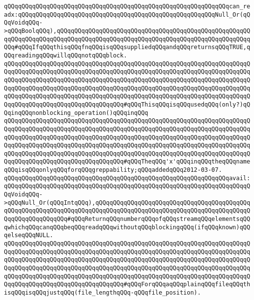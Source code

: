 \newline
\verb|qQQqqQQqqQQqqQQqqQQqqQQqqQQqqQQqqQQqqQQqqQQqqQQqqQQqqQQqqQQqqQQqcan_readx:qQQqqQQqqQQqqQQqqQQqqQQqqQQqqQQqqQQqqQQqqQQqqQQqqQQqqQQqNull_Or(qQQqVoidqQQq->qQQqBoolqQQq),qQQqqQQqqQQqqQQqqQQqqQQqqQQqqQQqqQQqqQQqqQQqqQQqqQQqqQQqqQQqqQQqqQQqqQQqqQQqqQQqqQQqqQQqqQQqqQQqqQQqqQQqqQQqqQQqqQQqqQQqqQQqqQQq#qQQqIfqQQqthisqQQqfnqQQqisqQQqsuppliedqQQqandqQQqreturnsqQQqTRUE,qQQqreadingqQQqwillqQQqnotqQQqblock.|\newline
\verb|qQQqqQQqqQQqqQQqqQQqqQQqqQQqqQQqqQQqqQQqqQQqqQQqqQQqqQQqqQQqqQQqqQQqqQQqqQQqqQQqqQQqqQQqqQQqqQQqqQQqqQQqqQQqqQQqqQQqqQQqqQQqqQQqqQQqqQQqqQQqqQQqqQQqqQQqqQQqqQQqqQQqqQQqqQQqqQQqqQQqqQQqqQQqqQQqqQQqqQQqqQQqqQQqqQQqqQQqqQQqqQQqqQQqqQQqqQQqqQQqqQQqqQQqqQQqqQQqqQQqqQQqqQQqqQQqqQQqqQQqqQQqqQQqqQQqqQQqqQQqqQQqqQQqqQQqqQQqqQQqqQQqqQQqqQQqqQQqqQQqqQQqqQQqqQQqqQQqqQQqqQQqqQQqqQQqqQQqqQQqqQQq#qQQqThisqQQqisqQQqusedqQQq(only?)qQQqinqQQqnonblocking_operation()qQQqinqQQq|\newline
\verb|qQQqqQQqqQQqqQQqqQQqqQQqqQQqqQQqqQQqqQQqqQQqqQQqqQQqqQQqqQQqqQQqqQQqqQQqqQQqqQQqqQQqqQQqqQQqqQQqqQQqqQQqqQQqqQQqqQQqqQQqqQQqqQQqqQQqqQQqqQQqqQQqqQQqqQQqqQQqqQQqqQQqqQQqqQQqqQQqqQQqqQQqqQQqqQQqqQQqqQQqqQQqqQQqqQQqqQQqqQQqqQQqqQQqqQQqqQQqqQQqqQQqqQQqqQQqqQQqqQQqqQQqqQQqqQQqqQQqqQQqqQQqqQQqqQQqqQQqqQQqqQQqqQQqqQQqqQQqqQQqqQQqqQQqqQQqqQQqqQQqqQQqqQQqqQQqqQQqqQQqqQQqqQQqqQQqqQQqqQQqqQQq#qQQqTheqQQq'x'qQQqinqQQqtheqQQqnameqQQqisqQQqonlyqQQqforqQQqgreppability;qQQqaddedqQQq2012-03-07.|\newline
\newline
\verb|qQQqqQQqqQQqqQQqqQQqqQQqqQQqqQQqqQQqqQQqqQQqqQQqqQQqqQQqqQQqqQQqavail:qQQqqQQqqQQqqQQqqQQqqQQqqQQqqQQqqQQqqQQqqQQqqQQqqQQqqQQqqQQqqQQqqQQqqQQqVoidqQQq->qQQqNull_Or(qQQqIntqQQq),qQQqqQQqqQQqqQQqqQQqqQQqqQQqqQQqqQQqqQQqqQQqqQQqqQQqqQQqqQQqqQQqqQQqqQQqqQQqqQQqqQQqqQQqqQQqqQQqqQQqqQQqqQQqqQQqqQQqqQQqqQQqqQQqqQQq#qQQqReturnqQQqnumberqQQqofqQQqstreamqQQqelementsqQQqwhichqQQqcanqQQqbeqQQqreadqQQqwithoutqQQqblockingqQQq(ifqQQqknown)qQQqelseqQQqNULL.|\newline
\verb|qQQqqQQqqQQqqQQqqQQqqQQqqQQqqQQqqQQqqQQqqQQqqQQqqQQqqQQqqQQqqQQqqQQqqQQqqQQqqQQqqQQqqQQqqQQqqQQqqQQqqQQqqQQqqQQqqQQqqQQqqQQqqQQqqQQqqQQqqQQqqQQqqQQqqQQqqQQqqQQqqQQqqQQqqQQqqQQqqQQqqQQqqQQqqQQqqQQqqQQqqQQqqQQqqQQqqQQqqQQqqQQqqQQqqQQqqQQqqQQqqQQqqQQqqQQqqQQqqQQqqQQqqQQqqQQqqQQqqQQqqQQqqQQqqQQqqQQqqQQqqQQqqQQqqQQqqQQqqQQqqQQqqQQqqQQqqQQqqQQqqQQqqQQqqQQqqQQqqQQqqQQqqQQqqQQqqQQqqQQqqQQq#qQQqForqQQqaqQQqplainqQQqfileqQQqthisqQQqisqQQqjustqQQq(file_lengthqQQq-qQQqfile_position).|\newline
